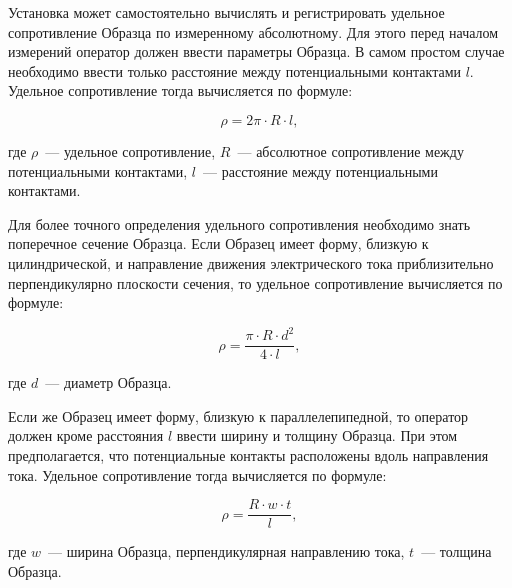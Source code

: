 \label{sec_rho_calcs}

Установка может самостоятельно вычислять и регистрировать удельное сопротивление Образца по измеренному абсолютному. Для этого перед началом измерений оператор должен ввести параметры Образца. В самом простом случае необходимо ввести только расстояние между потенциальными контактами $l$. Удельное сопротивление тогда вычисляется по формуле:

\begin{equation}
\rho = 2 \pi \cdot R \cdot l,
\end{equation}

\noindent где $\rho$~--- удельное сопротивление, $R$~--- абсолютное сопротивление между потенциальными контактами, $l$~--- расстояние между потенциальными контактами.

Для более точного определения удельного сопротивления необходимо знать поперечное сечение Образца. Если Образец имеет форму, близкую к цилиндрической, и направление движения электрического тока приблизительно перпендикулярно плоскости сечения, то удельное сопротивление вычисляется по формуле:

\begin{equation}
\rho = \frac{\pi \cdot R \cdot d^2}{4 \cdot l},
\end{equation}

\noindent где $d$~--- диаметр Образца.

Если же Образец имеет форму, близкую к параллелепипедной, то оператор должен кроме расстояния $l$ ввести ширину и толщину Образца. При этом предполагается, что потенциальные контакты расположены вдоль направления тока. Удельное сопротивление тогда вычисляется по формуле:

\begin{equation}
\rho = \frac{R \cdot w \cdot t}{l},
\end{equation}

\noindent где $w$~--- ширина Образца, перпендикулярная направлению тока, $t$~--- толщина Образца.
